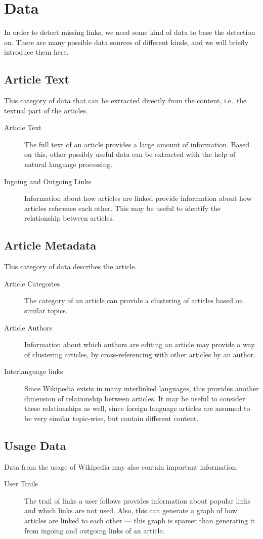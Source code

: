 
\section{Data}\label{sec:data}
In order to detect missing links, we need some kind of data to base the detection on. There are many possible data sources of different kinds, and we will briefly introduce them here.


\subsection{Article Text}
This category of data that can be extracted directly from the content, i.e.\ the textual part of the articles.
\begin{description}
  \item[Article Text] The full text of an article provides a large amount of information. Based on this, other possibly useful data can be extracted with the help of natural language processing.
  \item[Ingoing and Outgoing Links] Information about how articles are linked provide information about how articles reference each other. This may be useful to identify the relationship between articles.
\end{description}

\subsection{Article Metadata}
This category of data describes the article.
\begin{description}
  \item[Article Categories] The category of an article can provide a clustering of articles based on similar topics.
  \item[Article Authors] Information about which authors are editing an article may provide a way of clustering articles, by cross-referencing with other articles by an author.
  \item[Interlanguage links] Since Wikipedia exists in many interlinked languages, this provides another dimension of relationship between articles. It may be useful to consider these relationships as well, since foreign language articles are assumed to be very similar topic-wise, but contain different content.
\end{description}

\subsection{Usage Data}
Data from the usage of Wikipedia may also contain important information.
\begin{description}
  \item[User Trails] The trail of links a user follows provides information about popular links and which links are not used. Also, this can generate a graph of how articles are linked to each other --- this graph is sparser than generating it from ingoing and outgoing links of an article.
\end{description}

